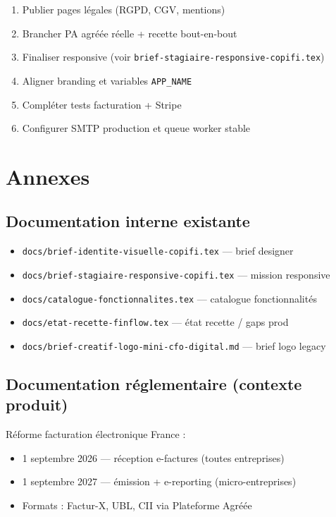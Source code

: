 \documentclass[11pt,a4paper]{report}
\newcommand{\filepath}[1]{\texttt{\small #1}}
\begin{document}
\begin{enumerate}[leftmargin=1.5em]
    \item Publier pages légales (RGPD, CGV, mentions)
    \item Brancher PA agréée réelle + recette bout-en-bout
    \item Finaliser responsive (voir \filepath{brief-stagiaire-responsive-copifi.tex})
    \item Aligner branding et variables \texttt{APP\_NAME}
    \item Compléter tests facturation + Stripe
    \item Configurer SMTP production et queue worker stable
\end{enumerate}

\chapter{Annexes}

\section{Documentation interne existante}

\begin{itemize}[leftmargin=1.5em]
    \item \filepath{docs/brief-identite-visuelle-copifi.tex} — brief designer
    \item \filepath{docs/brief-stagiaire-responsive-copifi.tex} — mission responsive
    \item \filepath{docs/catalogue-fonctionnalites.tex} — catalogue fonctionnalités
    \item \filepath{docs/etat-recette-finflow.tex} — état recette / gaps prod
    \item \filepath{docs/brief-creatif-logo-mini-cfo-digital.md} — brief logo legacy
\end{itemize}

\section{Documentation réglementaire (contexte produit)}

Réforme facturation électronique France :
\begin{itemize}[leftmargin=1.5em]
    \item 1\er{} septembre 2026 — réception e-factures (toutes entreprises)
    \item 1\er{} septembre 2027 — émission + e-reporting (micro-entreprises)
    \item Formats : Factur-X, UBL, CII via Plateforme Agréée
\end{itemize}
\end{document}

